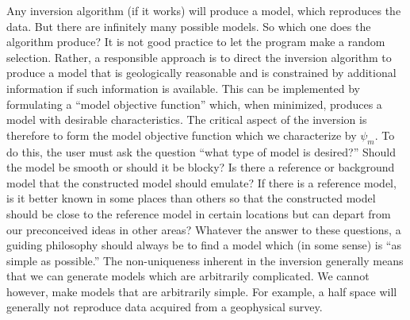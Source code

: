 Any inversion algorithm (if it works) will produce a model, which reproduces the data. But there are infinitely many possible models. So which one does the algorithm produce? It is not good practice to let the program make a random selection. Rather, a responsible approach is to direct the inversion algorithm to produce a model that is geologically reasonable and is constrained by additional information if such information is available. This can be implemented by formulating a ``model objective function'' which, when minimized, produces a model with desirable characteristics. The critical aspect of the inversion is therefore to form the model objective function which we characterize by $\psi_m$. To do this, the user must ask the question ``what type of model is desired?'' Should the model be smooth or should it be blocky? Is there a reference or background model that the constructed model should emulate? If there is a reference model, is it better known in some places than others so that the constructed model should be close to the reference model in certain locations but can depart from our preconceived ideas in other areas? Whatever the answer to these questions, a guiding philosophy should always be to find a model which (in some sense) is ``as simple as possible.'' The non-uniqueness inherent in the inversion generally means that we can generate models which are arbitrarily complicated. We cannot however, make models that are arbitrarily simple. For example, a half space will generally not reproduce data acquired from a geophysical survey. 

